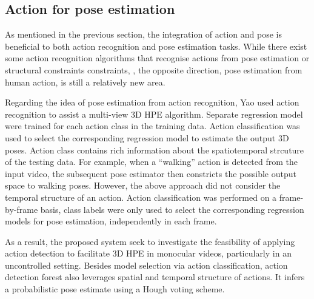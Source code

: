 \subsection{Action for pose estimation}

As mentioned in the previous section, the integration of action and pose is beneficial to both action recognition and pose estimation tasks. 
While there exist some action recognition algorithms that recognise actions from pose estimation or structural constraints constraints, \eg \cite{Yu2010, Raja2011}, the opposite direction, \ie pose estimation from human action, is still a relatively new area. 

Regarding the idea of pose estimation from action recognition, Yao \etal \cite{Yao2012} used action recognition to assist a multi-view 3D HPE algorithm. 
Separate regression model were trained for each action class in the training data. 
Action classification was used to select the corresponding regression model to estimate the output 3D poses. 
Action class contains rich information about the spatiotemporal strcuture of the testing data. For example, when a ``walking'' action is detected from the input video, the subsequent pose estimator then constricts the possible output space to walking poses.   
However, the above approach did not consider the temporal structure of an action.    
Action classification was performed on a frame-by-frame basis, class labels were only used to select the corresponding regression models for pose estimation, independently in each frame.  

As a result, the proposed system seek to investigate the feasibility of applying action detection to facilitate 3D HPE in monocular videos, particularly in an uncontrolled setting. 
Besides model selection via action classification, action detection forest also leverages spatial and temporal structure of actions. It infers a probabilistic pose estimate using a Hough voting scheme.  


